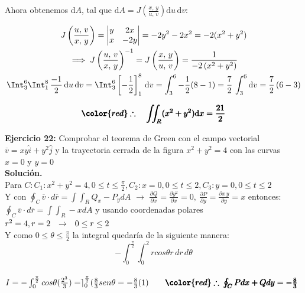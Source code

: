 \documentclass[12pt]{article}
\begin{document}
\noindent Ahora obtenemos $\mathrm{d}A$, tal que $\mathrm{d}A = J\left(\frac{x,\,y}{u,\,v}\right) \mathrm{d}u\,\mathrm{d}v$:

\begin{gather*}
	J\left(\frac{u,\,v}{x,\,y}\right) = 
	\begin{vmatrix}
		y & 2x \\
		x & -2y
	\end{vmatrix} = -2y^2-2x^2 = -2(x^2+y^2) \\
	\implies J\left(\frac{u,\,v}{x,\,y}\right)^{-1} = J\left(\frac{x,\,y}{u,\,v}\right) = \frac{1}{-2\left(x^2+y^2\right)} \\
	\Int_3^6 \Int_1^8 \, \frac{-1}{2}\,\mathrm{d}u\,\mathrm{d}v = \Int_3^6 \left[-\frac{1}{2}\right]_1^8 \, \mathrm{d}v = \int_3^6 -\frac{1}{2} (8 - 1) = \frac{7}{2} \, \int_3^6 \mathrm{d}v = \frac{7}{2}\,(6-3)
\end{gather*}

\begin{gather*}
	\pmb{\color{red} \therefore \quad \iint_R (x^2 + y^2) \mathrm{d}x = \frac{21}{2}}
\end{gather*}

\textbf{Ejercicio 22:} Comprobar el teorema de Green con el campo vectorial $\overline{v}=xy\hat{i}+y^2\hat{j}$ y la trayectoria cerrada de la figura $x^2+y^2=4$ con las curvas $x=0$ y $y=0$
\\[10pt]
\textbf{Solución.}
\\[10pt]
Para $C: C_{1}: x^2+y^2=4, 0\leq t \leq \frac{\pi}{2}, C_{2}: x=0, 0\leq t \leq 2, C_{3}: y=0, 0\leq t \leq 2$
\\[7pt]
Y con $\oint_{C}\overline{v}\cdot d\overline{r}=\int\int_{R}Q_{x}-P_{y}dA$ $\rightarrow$ $\frac{\partial Q}{\partial x}=\frac{\partial y^2}{\partial x} = 0, \: \frac{\partial P}{\partial y} = \frac{\partial x\,y}{\partial y} = x $ entonces:
\\[7pt]
$\oint_{C}\overline{v}\cdot d\overline{r}=\int\int_{R}-x dA$ y usando coordenadas polares $r^2=4, r=2 \hspace{0.25cm} \rightarrow \hspace{0.25cm} 0\leq r \leq2$
\\[7pt]
Y como $0\leq \theta \leq\frac{\pi}{2}$ la integral quedaría de la siguiente manera:
\[ -\int_{0}^{\frac{\pi}{2}} \int_{0}^{2} rcos\theta r \,dr\,d\theta \]
\\[7pt]
$I=-\int_{0}^{\frac{\pi}{2}}cos\theta(\frac{2^3}{3})=\rceil_{0}^{\frac{\pi}{2}}(\frac{8}{3}sen\theta=-\frac{8}{3}(1) \qquad \pmb{\color{red} \therefore \: \oint_{C}Pdx+Qdy=-\frac{8}{3}}$
\end{document}

